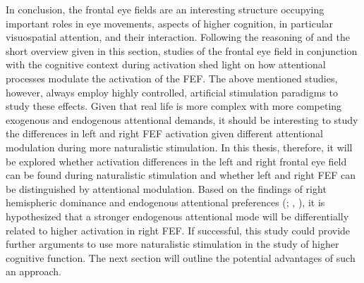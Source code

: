 \documentclass[a4paper, 12pt]{scrreprt}
\begin{document}
In conclusion, the frontal eye fields are an interesting structure occupying important roles in eye movements, aspects of higher cognition, in particular visuospatial attention, and their interaction. Following the reasoning of \textcite{vernet2014corrigendum} and the short overview given in this section, studies of the frontal eye field in conjunction with the cognitive context during activation shed light on how attentional processes modulate the activation of the FEF. The above mentioned studies, however, always employ highly controlled, artificial stimulation paradigms to study these effects. Given that real life is more complex with more competing exogenous and endogenous attentional demands, it should be interesting to study the differences in left and right FEF activation given different attentional modulation during more naturalistic stimulation. In this thesis, therefore, it will be explored whether activation differences in the left and right frontal eye field can be found during naturalistic stimulation and whether left and right FEF can be distinguished by attentional modulation. Based on the findings of right hemispheric dominance and endogenous attentional preferences (\cite{muggleton2003human}; \cite{grosbras2002transcranial}, \cite{siman2007bihemispheric}), it is hypothesized that a stronger endogenous attentional mode will be differentially related to higher activation in right FEF. If successful, this study could provide further arguments to use more naturalistic stimulation in the study of higher cognitive function. The next section will outline the potential advantages of such an approach. \newline
\end{document}
